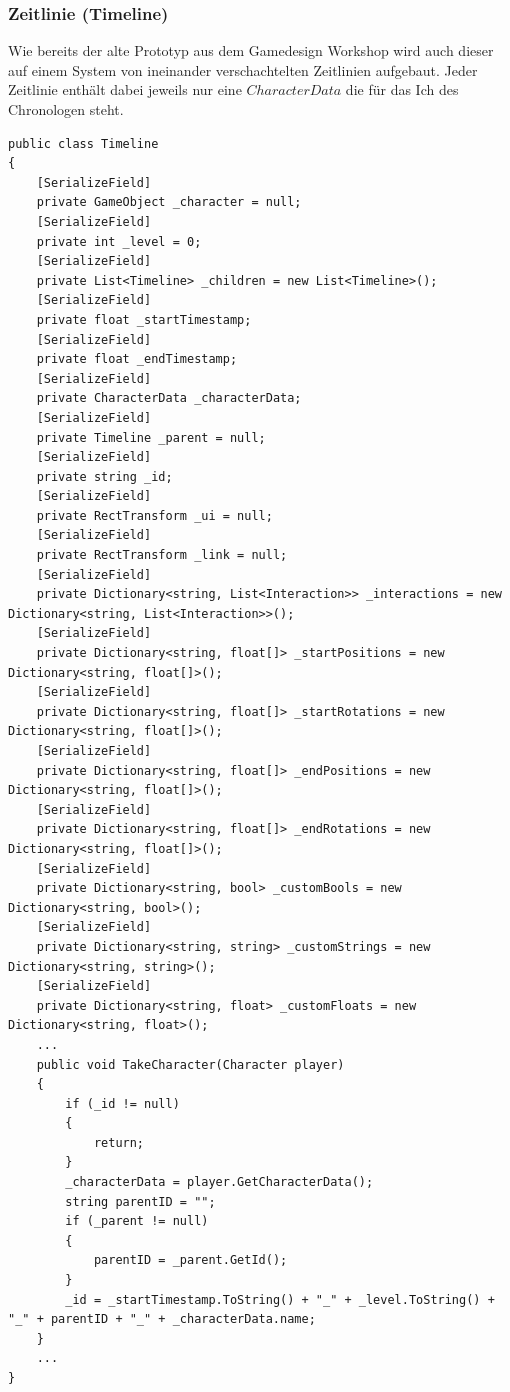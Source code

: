 \subsubsection{Zeitlinie (Timeline)}
Wie bereits der alte Prototyp aus dem Gamedesign Workshop wird auch dieser auf einem System von ineinander verschachtelten Zeitlinien aufgebaut. Jeder Zeitlinie enthält dabei jeweils nur eine $CharacterData$ die für das Ich des Chronologen steht.
\begin{lstlisting}[caption={Timeline.ts dieses Prototyps}, label={sec:timeline_class}]
public class Timeline
{
    [SerializeField]
    private GameObject _character = null;
    [SerializeField]
    private int _level = 0;
    [SerializeField]
    private List<Timeline> _children = new List<Timeline>();
    [SerializeField]
    private float _startTimestamp;
    [SerializeField]
    private float _endTimestamp;
    [SerializeField]
    private CharacterData _characterData;
    [SerializeField]
    private Timeline _parent = null;
    [SerializeField]
    private string _id;
    [SerializeField]
    private RectTransform _ui = null;
    [SerializeField]
    private RectTransform _link = null;
    [SerializeField]
    private Dictionary<string, List<Interaction>> _interactions = new Dictionary<string, List<Interaction>>();
    [SerializeField]
    private Dictionary<string, float[]> _startPositions = new Dictionary<string, float[]>();
    [SerializeField]
    private Dictionary<string, float[]> _startRotations = new Dictionary<string, float[]>();
    [SerializeField]
    private Dictionary<string, float[]> _endPositions = new Dictionary<string, float[]>();
    [SerializeField]
    private Dictionary<string, float[]> _endRotations = new Dictionary<string, float[]>();
    [SerializeField]
    private Dictionary<string, bool> _customBools = new Dictionary<string, bool>();
    [SerializeField]
    private Dictionary<string, string> _customStrings = new Dictionary<string, string>();
    [SerializeField]
    private Dictionary<string, float> _customFloats = new Dictionary<string, float>();
    ...
    public void TakeCharacter(Character player)
    {
        if (_id != null)
        {
            return;
        }
        _characterData = player.GetCharacterData();
        string parentID = "";
        if (_parent != null)
        {
            parentID = _parent.GetId();
        }
        _id = _startTimestamp.ToString() + "_" + _level.ToString() + "_" + parentID + "_" + _characterData.name;
    }
    ...
}
\end{lstlisting}

